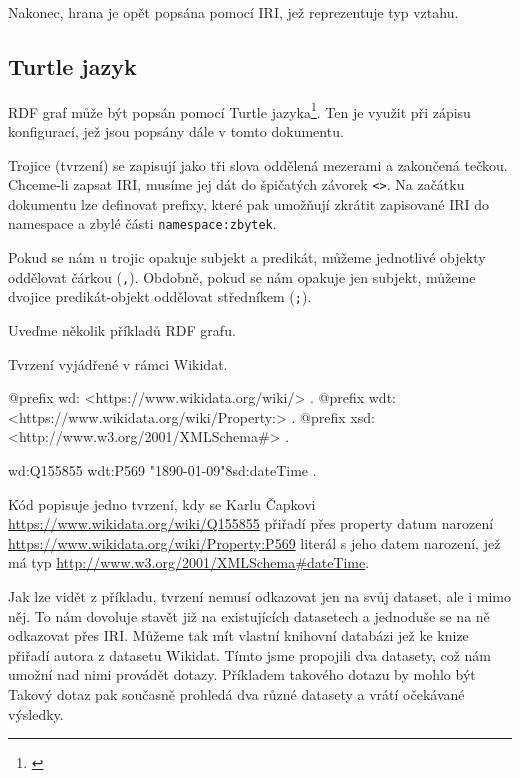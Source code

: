 Nakonec, hrana je opět popsána pomocí IRI, jež reprezentuje typ vztahu.

\subsection{Turtle jazyk}
RDF graf může být popsán pomocí Turtle jazyka\footnote{\citet{Prud'hommeaux:14:RT}}. Ten je využit při zápisu konfigurací, jež jsou popsány dále v tomto dokumentu.

Trojice (tvrzení) se zapisují jako tři slova oddělená mezerami a zakončená tečkou. Chceme-li zapsat IRI, musíme jej dát do špičatých závorek \texttt{<>}. Na začátku dokumentu lze definovat prefixy, které pak umožňují zkrátit zapisované IRI do namespace a zbylé části \texttt{namespace:zbytek}.

Pokud se nám u trojic opakuje subjekt a predikát, můžeme jednotlivé objekty oddělovat čárkou (\texttt{,}). Obdobně, pokud se nám opakuje jen subjekt, můžeme dvojice predikát-objekt oddělovat středníkem (\texttt{;}).

\newpage

Uveďme několik příkladů RDF grafu.

\begin{prikl}
Tvrzení  vyjádřené v rámci Wikidat.
\begin{code}
@prefix wd: <https://www.wikidata.org/wiki/> .
@prefix wdt: <https://www.wikidata.org/wiki/Property:> .
@prefix xsd: <http://www.w3.org/2001/XMLSchema#> .

wd:Q155855 wdt:P569 "1890-01-09"^^xsd:dateTime .
\end{code}

Kód popisuje jedno tvrzení, kdy se Karlu Čapkovi \\ \url{https://www.wikidata.org/wiki/Q155855} přiřadí přes property datum narození \url{https://www.wikidata.org/wiki/Property:P569} literál s jeho datem narození, jež má typ \url{http://www.w3.org/2001/XMLSchema#dateTime}.
\end{prikl}

Jak lze vidět z příkladu, tvrzení nemusí odkazovat jen na svůj dataset, ale i mimo něj. To nám dovoluje stavět již na existujících datasetech a jednoduše se na ně odkazovat přes IRI. Můžeme tak mít vlastní knihovní databázi jež ke knize přiřadí autora z datasetu Wikidat. Tímto jsme propojili dva datasety, což nám umožní nad nimi provádět dotazy. Příkladem takového dotazu by mohlo být  Takový dotaz pak současně prohledá dva různé datasety a vrátí očekávané výsledky.

